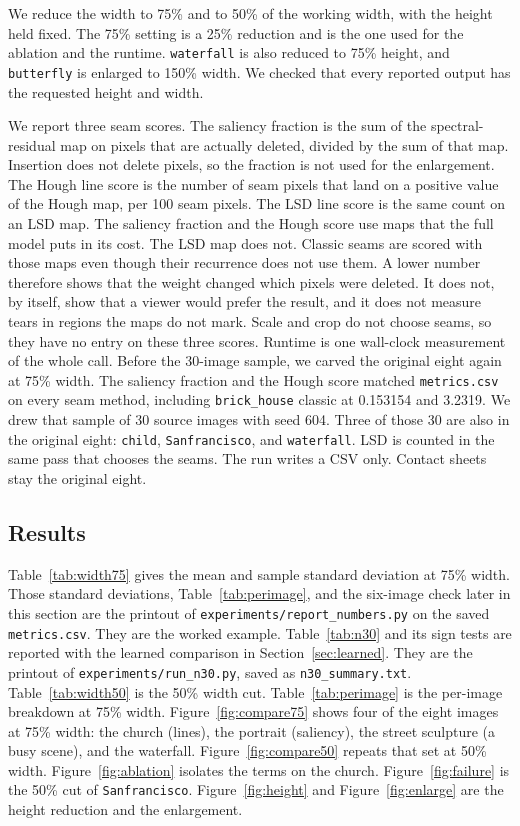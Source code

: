 \documentclass[10pt,twocolumn,letterpaper]{article}
\begin{document}
We reduce the width to 75\% and to 50\% of the working width, with the height held fixed.
The 75\% setting is a 25\% reduction and is the one used for the ablation and the runtime.
\texttt{waterfall} is also reduced to 75\% height, and \texttt{butterfly} is enlarged to 150\% width.
We checked that every reported output has the requested height and width.

We report three seam scores.
The saliency fraction is the sum of the spectral-residual map on pixels that are actually deleted, divided by the sum of that map.
Insertion does not delete pixels, so the fraction is not used for the enlargement.
The Hough line score is the number of seam pixels that land on a positive value of the Hough map, per 100 seam pixels.
The LSD line score is the same count on an LSD map.
The saliency fraction and the Hough score use maps that the full model puts in its cost.
The LSD map does not.
Classic seams are scored with those maps even though their recurrence does not use them.
A lower number therefore shows that the weight changed which pixels were deleted.
It does not, by itself, show that a viewer would prefer the result, and it does not measure tears in regions the maps do not mark.
Scale and crop do not choose seams, so they have no entry on these three scores.
Runtime is one wall-clock measurement of the whole call.
Before the 30-image sample, we carved the original eight again at 75\% width.
The saliency fraction and the Hough score matched \texttt{metrics.csv} on every seam method, including \texttt{brick\_house} classic at 0.153154 and 3.2319.
We drew that sample of 30 source images with seed 604.
Three of those 30 are also in the original eight: \texttt{child}, \texttt{Sanfrancisco}, and \texttt{waterfall}.
LSD is counted in the same pass that chooses the seams.
The run writes a CSV only.
Contact sheets stay the original eight.

\subsection{Results}
Table~\ref{tab:width75} gives the mean and sample standard deviation at 75\% width.
Those standard deviations, Table~\ref{tab:perimage}, and the six-image check later in this section are the printout of \texttt{experiments/report\_numbers.py} on the saved \texttt{metrics.csv}.
They are the worked example.
Table~\ref{tab:n30} and its sign tests are reported with the learned comparison in Section~\ref{sec:learned}. They are the printout of \texttt{experiments/run\_n30.py}, saved as \texttt{n30\_summary.txt}.
Table~\ref{tab:width50} is the 50\% width cut.
Table~\ref{tab:perimage} is the per-image breakdown at 75\% width.
Figure~\ref{fig:compare75} shows four of the eight images at 75\% width: the church (lines), the portrait (saliency), the street sculpture (a busy scene), and the waterfall.
Figure~\ref{fig:compare50} repeats that set at 50\% width.
Figure~\ref{fig:ablation} isolates the terms on the church.
Figure~\ref{fig:failure} is the 50\% cut of \texttt{Sanfrancisco}.
Figure~\ref{fig:height} and Figure~\ref{fig:enlarge} are the height reduction and the enlargement.
\end{document}
